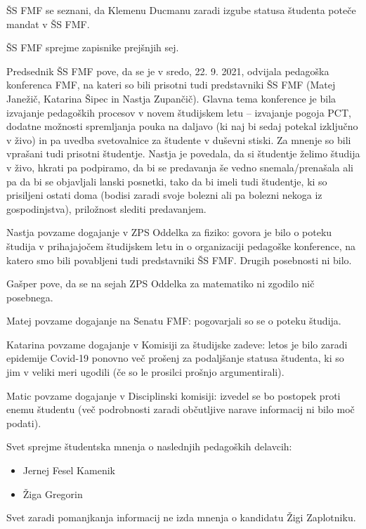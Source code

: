 \documentclass{seja}
\begin{document}
\begin{ad}
    \item 
    ŠS FMF se seznani, da Klemenu Ducmanu zaradi izgube statusa študenta poteče mandat v ŠS FMF.
    
    \item
    \begin{sklep*}
        ŠS FMF sprejme zapisnike prejšnjih sej.
    \end{sklep*}
    
    \item
    Predsednik ŠS FMF pove, da se je v sredo, 22. 9. 2021, odvijala pedagoška konferenca FMF, na kateri so bili prisotni tudi predstavniki ŠS FMF (Matej Janežič, Katarina Šipec in Nastja Zupančič). Glavna tema konference je bila izvajanje pedagoških  procesov v novem študijskem letu -- izvajanje pogoja PCT, dodatne možnosti spremljanja pouka na daljavo (ki naj bi sedaj potekal izključno v živo) in pa uvedba svetovalnice za študente v duševni stiski. Za mnenje so bili vprašani tudi prisotni študentje. Nastja je povedala, da si študentje želimo študija v živo, hkrati pa podpiramo, da bi se predavanja še vedno snemala/prenašala ali pa da bi se objavljali lanski posnetki, tako da bi imeli tudi študentje, ki so prisiljeni ostati doma (bodisi zaradi svoje bolezni ali pa bolezni nekoga iz gospodinjstva), priložnost slediti predavanjem.
    
    \item
    Nastja povzame dogajanje v ZPS Oddelka za fiziko: govora je bilo o poteku študija v prihajajočem študijskem letu in o organizaciji pedagoške konference, na katero smo bili povabljeni tudi predstavniki ŠS FMF. Drugih posebnosti ni bilo.
    
    Gašper pove, da se na sejah ZPS Oddelka za matematiko ni zgodilo nič posebnega.
    
    Matej povzame dogajanje na Senatu FMF: pogovarjali so se o poteku študija.
    
    Katarina povzame dogajanje v Komisiji za študijske zadeve: letos je bilo zaradi epidemije Covid-19 ponovno več prošenj za podaljšanje statusa študenta, ki so jim v veliki meri ugodili (če so le prosilci prošnjo argumentirali).
    
    Matic povzame dogajanje v Disciplinski komisiji: izvedel se bo postopek proti enemu študentu (več podrobnosti zaradi občutljive narave informacij ni bilo moč podati).
    \item 
    \begin{sklep*}
    Svet sprejme študentska mnenja o naslednjih pedagoških delavcih:
        \begin{itemize}
            \item Jernej Fesel Kamenik
            \item Žiga Gregorin
        \end{itemize}
    Svet zaradi pomanjkanja informacij ne izda mnenja o kandidatu Žigi Zaplotniku.
    \end{sklep*}


\end{ad}
\end{document}
